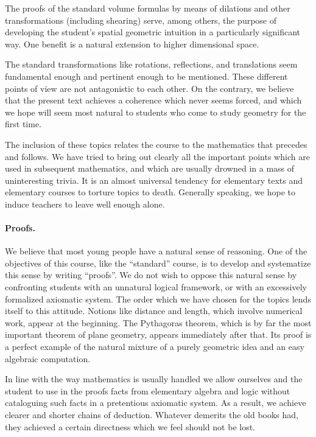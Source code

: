 \documentclass[12pt]{book} %
\begin{document}
The proofs of the standard volume formulas by means of dilations and other transformations (including shearing) serve, among others, the purpose of developing the student's spatial geometric intuition in a particularly significant way. One benefit is a natural extension to higher dimensional space.

The standard transformations like rotations, reflections, and translations seem fundamental enough and pertinent enough to be mentioned. These different points of view are not antagonistic to each other. On the contrary, we believe that the present text achieves a coherence which never seems forced, and which we hope will seem most natural to students who come to study geometry for the first time.

The inclusion of these topics relates the course to the mathematics that precedes and follows. We have tried to bring out clearly all the important points which are used in subsequent mathematics, and which are usually drowned in a mass of uninteresting trivia. It is an almost universal tendency for elementary texts and elementary courses to torture topics to death. Generally speaking, we hope to induce teachers to leave well enough alone.

\paragraph{Proofs.}
We believe that most young people have a natural sense of reasoning. One of the objectives of this course, like the ``standard'' course, is to develop and systematize this sense by writing ``proofs''. We do not wish to oppose this natural sense by confronting students with an unnatural logical framework, or with an excessively formalized axiomatic system. The order which we have chosen for the topics lends itself to this attitude. Notions like distance and length, which involve numerical work, appear at the beginning. The Pythagoras theorem, which is by far the most important theorem of plane geometry, appears immediately after that. Its proof is a perfect example of the natural mixture of a purely geometric idea and an easy algebraic computation.

In line with the way mathematics is usually handled we allow ourselves and the student to use in the proofs facts from elementary algebra and logic without cataloguing such facts in a pretentious axiomatic system. As a result, we achieve clearer and shorter chains of deduction. Whatever demerits the old books had, they achieved a certain directness which we feel should not be lost.
\end{document}
